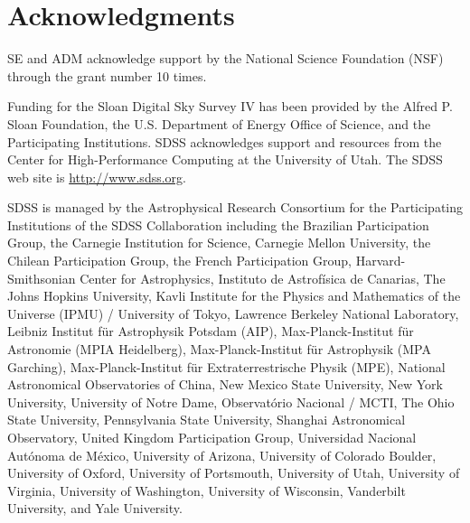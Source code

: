 \documentclass[useAMS,usenatbib]{mn2e}
\begin{document}
\section*{Acknowledgments}
SE and ADM acknowledge support by the National Science Foundation (NSF) through the 
grant number 10 times. 

Funding for the Sloan Digital Sky Survey IV has been provided by the Alfred P. 
Sloan Foundation, the U.S. Department of Energy Office of Science, and the 
Participating Institutions. SDSS acknowledges support and resources from the 
Center for High-Performance Computing at the University of Utah. The SDSS web 
site is \url{http://www.sdss.org}.

SDSS is managed by the Astrophysical Research Consortium for the Participating 
Institutions of the SDSS Collaboration including the Brazilian Participation 
Group, the Carnegie Institution for Science, Carnegie Mellon University, the 
Chilean Participation Group, the French Participation Group, Harvard-Smithsonian 
Center for Astrophysics, Instituto de Astrof\'{i}sica de Canarias, The Johns 
Hopkins University, Kavli Institute for the Physics and Mathematics of the 
Universe (IPMU) / University of Tokyo, Lawrence Berkeley National Laboratory, 
Leibniz Institut f\"{u}r Astrophysik Potsdam (AIP), Max-Planck-Institut f\"{u}r 
Astronomie (MPIA Heidelberg), Max-Planck-Institut für Astrophysik (MPA 
Garching), Max-Planck-Institut für Extraterrestrische Physik (MPE), National 
Astronomical Observatories of China, New Mexico State University, New York 
University, University of Notre Dame, Observatório Nacional / MCTI, The Ohio 
State University, Pennsylvania State University, Shanghai Astronomical 
Observatory, United Kingdom Participation Group, Universidad Nacional 
Aut\'{o}noma de M\'{e}xico, University of Arizona, University of Colorado 
Boulder, University of Oxford, University of Portsmouth, University of Utah, 
University of Virginia, University of Washington, University of Wisconsin, 
Vanderbilt University, and Yale University.
\newpage


\end{document}

